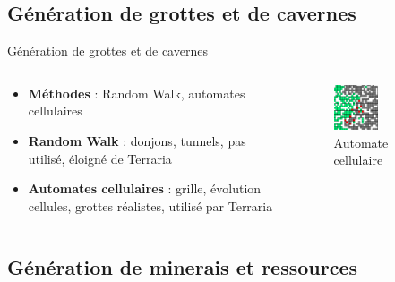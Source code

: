 \documentclass[aspectratio=169]{beamer}
\begin{document}
\subsection{Génération de grottes et de cavernes}

\begin{frame}{Génération de grottes et de cavernes}
    \begin{columns}
        \centering
        \begin{column}{0.5\textwidth}
            \centering
            \begin{itemize}
                \item \textbf{Méthodes} : Random Walk, automates cellulaires
                \item \textbf{Random Walk} : donjons, tunnels, pas utilisé, éloigné de Terraria
                \item \textbf{Automates cellulaires} : grille, évolution cellules, grottes réalistes, utilisé par Terraria
            \end{itemize}
        \end{column}
        \begin{column}{0.5\textwidth}
            \centering
            \begin{figure}
                \centering
                \captionsetup{format=sanslabel}
                \includegraphics[width=0.5\textwidth]{assets/automate_cellulaire.png}
                \caption{Automate cellulaire}
            \end{figure}
        \end{column}
    \end{columns}
\end{frame}

\subsection{Génération de minerais et ressources}
\end{document}
